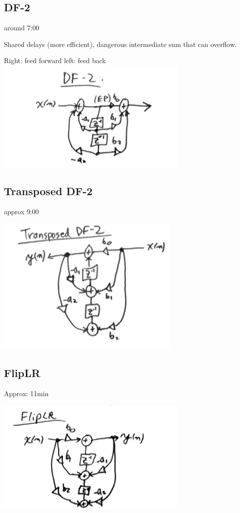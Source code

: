\subsection*{DF-2}

around 7:00

Shared delays (more efficient), dangerous intermediate sum that can overflow.

Right: feed forward
left: feed back 
\includegraphics[scale=0.5]{frames/5_c}

\subsection*{Transposed DF-2}
approx 9:00 


\includegraphics[scale=0.5]{frames/5_d}

\subsection*{FlipLR}
Approx: 11min\\

\includegraphics[scale=0.5]{frames/5_e}\\

